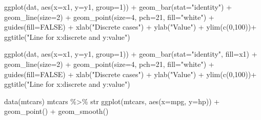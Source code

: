 \documentclass[
]{book}
\newenvironment{Shaded}{\begin{snugshade}}{\end{snugshade}}
\newcommand{\AttributeTok}[1]{\textcolor[rgb]{0.77,0.63,0.00}{#1}}
\newcommand{\ConstantTok}[1]{\textcolor[rgb]{0.00,0.00,0.00}{#1}}
\newcommand{\DecValTok}[1]{\textcolor[rgb]{0.00,0.00,0.81}{#1}}
\newcommand{\FunctionTok}[1]{\textcolor[rgb]{0.00,0.00,0.00}{#1}}
\newcommand{\NormalTok}[1]{#1}
\newcommand{\SpecialCharTok}[1]{\textcolor[rgb]{0.00,0.00,0.00}{#1}}
\newcommand{\StringTok}[1]{\textcolor[rgb]{0.31,0.60,0.02}{#1}}
\begin{document}
\begin{Shaded}
\begin{Highlighting}[]
\FunctionTok{ggplot}\NormalTok{(dat, }\FunctionTok{aes}\NormalTok{(}\AttributeTok{x=}\NormalTok{x1, }\AttributeTok{y=}\NormalTok{y1, }\AttributeTok{group=}\DecValTok{1}\NormalTok{)) }\SpecialCharTok{+}
  \FunctionTok{geom\_bar}\NormalTok{(}\AttributeTok{stat=}\StringTok{"identity"}\NormalTok{) }\SpecialCharTok{+}
  \FunctionTok{geom\_line}\NormalTok{(}\AttributeTok{size=}\DecValTok{2}\NormalTok{) }\SpecialCharTok{+}
  \FunctionTok{geom\_point}\NormalTok{(}\AttributeTok{size=}\DecValTok{4}\NormalTok{, }\AttributeTok{pch=}\DecValTok{21}\NormalTok{, }\AttributeTok{fill=}\StringTok{"white"}\NormalTok{) }\SpecialCharTok{+}
  \FunctionTok{guides}\NormalTok{(}\AttributeTok{fill=}\ConstantTok{FALSE}\NormalTok{) }\SpecialCharTok{+}
  \FunctionTok{xlab}\NormalTok{(}\StringTok{"Discrete cases"}\NormalTok{) }\SpecialCharTok{+} \FunctionTok{ylab}\NormalTok{(}\StringTok{"Value"}\NormalTok{) }\SpecialCharTok{+}
  \FunctionTok{ylim}\NormalTok{(}\FunctionTok{c}\NormalTok{(}\DecValTok{0}\NormalTok{,}\DecValTok{100}\NormalTok{))}\SpecialCharTok{+}
  \FunctionTok{ggtitle}\NormalTok{(}\StringTok{"Line for x:discrete and y:value"}\NormalTok{)}
  

\FunctionTok{ggplot}\NormalTok{(dat, }\FunctionTok{aes}\NormalTok{(}\AttributeTok{x=}\NormalTok{x1, }\AttributeTok{y=}\NormalTok{y1, }\AttributeTok{group=}\DecValTok{1}\NormalTok{)) }\SpecialCharTok{+}
  \FunctionTok{geom\_bar}\NormalTok{(}\AttributeTok{stat=}\StringTok{"identity"}\NormalTok{, }\AttributeTok{fill=}\NormalTok{x1) }\SpecialCharTok{+}
  \FunctionTok{geom\_line}\NormalTok{(}\AttributeTok{size=}\DecValTok{2}\NormalTok{) }\SpecialCharTok{+}
  \FunctionTok{geom\_point}\NormalTok{(}\AttributeTok{size=}\DecValTok{4}\NormalTok{, }\AttributeTok{pch=}\DecValTok{21}\NormalTok{, }\AttributeTok{fill=}\StringTok{"white"}\NormalTok{) }\SpecialCharTok{+}
  \FunctionTok{guides}\NormalTok{(}\AttributeTok{fill=}\ConstantTok{FALSE}\NormalTok{) }\SpecialCharTok{+}
  \FunctionTok{xlab}\NormalTok{(}\StringTok{"Discrete cases"}\NormalTok{) }\SpecialCharTok{+} \FunctionTok{ylab}\NormalTok{(}\StringTok{"Value"}\NormalTok{) }\SpecialCharTok{+}
  \FunctionTok{ylim}\NormalTok{(}\FunctionTok{c}\NormalTok{(}\DecValTok{0}\NormalTok{,}\DecValTok{100}\NormalTok{))}\SpecialCharTok{+}
  \FunctionTok{ggtitle}\NormalTok{(}\StringTok{"Line for x:discrete and y:value"}\NormalTok{)}

\FunctionTok{data}\NormalTok{(mtcars)}
\NormalTok{mtcars }\SpecialCharTok{\%\textgreater{}\%}\NormalTok{ str}
\FunctionTok{ggplot}\NormalTok{(mtcars, }\FunctionTok{aes}\NormalTok{(}\AttributeTok{x=}\NormalTok{mpg, }\AttributeTok{y=}\NormalTok{hp)) }\SpecialCharTok{+}
  \FunctionTok{geom\_point}\NormalTok{() }\SpecialCharTok{+}
  \FunctionTok{geom\_smooth}\NormalTok{()}




\end{Highlighting}
\end{Shaded}
\end{document}
